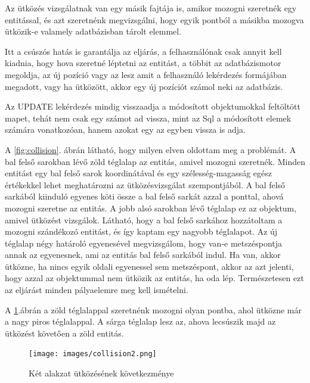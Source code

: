 Az ütközés vizsgálatnak van egy másik fajtája is, amikor mozogni szeretnék egy entitással, és azt szeretnénk megvizsgálni, hogy egyik pontból a másikba mozogva ütközik-e valamely adatbázisban tárolt elemmel.

Itt a csúszós hatás is garantálja az eljárás, a felhasználónak csak annyit kell kiadnia, hogy hova szeretné léptetni az entitást, a többit az adatbázismotor megoldja, az új pozíció vagy az lesz amit a felhasználó lekérdezés formájában megadott, vagy ha ütközött, akkor egy új pozíciót számol neki az adatbázis.

Az UPDATE lekérdezés mindig visszaadja a módosított objektumokkal feltöltött mapet, tehát nem csak egy számot ad vissza, mint az Sql a módosított elemek számára vonatkozóan, hanem azokat egy az egyben vissza is adja.



A \ref{fig:collision}. ábrán látható, hogy milyen elven oldottam meg a problémát. A bal fels\H o sarokban lév\H o zöld téglalap az entitás, amivel mozogni szeretnék. Minden entitást egy bal fels\H o sarok koordinátával és egy szélesség-magasság egész értékekkel lehet meghatározni az ütközésvizsgálat szempontjából. A bal fels\H o sarkából kiinduló egyenes köti össze a bal fels\H o sarkát azzal a ponttal, ahová mozogni szeretne az entitás. A jobb alsó sarokban lév\H o téglalap ez az objektum, amivel ütközést vizsgálok. Látható, hogy a bal fels\H o sarkához hozzátoltam a mozogni szándékozó entitást, és így kaptam egy nagyobb téglalapot.
Az új téglalap négy határoló egyenesével megvizsgálom, hogy van-e metszéspontja annak az egyenesnek, ami az entitás bal fels\H o sarkából indul. Ha van, akkor ütközne, ha nincs egyik oldali egyenessel sem metszéspont, akkor az azt jelenti, hogy azzal az objektummal nem ütközik az entitás, ha oda lép. Természetesen ezt az eljárást minden pályaelemre meg kell ismételni.



A \ref{fig:collision2}.ábrán a zöld téglalappal szeretnénk mozogni olyan pontba, ahol ütközne már a nagy piros téglalappal. A sárga téglalap lesz az, ahova lecsúszik majd az ütközést követ\H oen a zöld entitás.

\begin{figure}[htb]
	\begin{center}
		\texttt{[image: images/collision2.png]}
		\caption{Két alakzat ütközésének következménye}
		\label{fig:collision2}
	\end{center}
\end{figure}

